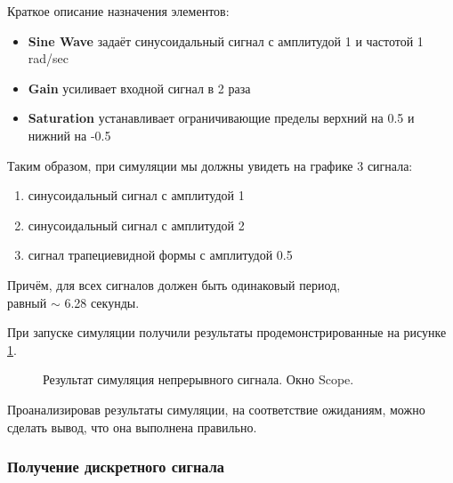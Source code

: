 \documentclass[a4paper,14pt]{extarticle}
\begin{document}
Краткое описание назначения элементов:
\begin{itemize}
\item \textbf{Sine Wave} задаёт синусоидальный сигнал с амплитудой 1 и частотой 1 rad/sec
\item \textbf{Gain} усиливает входной сигнал в 2 раза
\item \textbf{Saturation} устанавливает ограничивающие пределы верхний на 0.5 и нижний на -0.5\\
\end{itemize}

Таким образом, при симуляции мы должны увидеть на графике 3 сигнала:
\begin{enumerate}
\item синусоидальный сигнал с амплитудой 1
\item синусоидальный сигнал с амплитудой 2
\item сигнал трапециевидной формы с амплитудой 0.5
\end{enumerate}

Причём, для всех сигналов должен быть одинаковый период,\\ равный 
$\sim$ 6.28 секунды.\\

\newpage

При запуске симуляции получили результаты продемонстрированные на рисунке \ref{002}.

\begin{figure}[H]
\caption{Результат симуляция непрерывного сигнала. Окно Scope.}
\label{002}
\end{figure}

Проанализировав результаты симуляции, на соответствие ожиданиям, можно сделать вывод, что она выполнена правильно.

\subsubsection{Получение дискретного сигнала}
\end{document}
